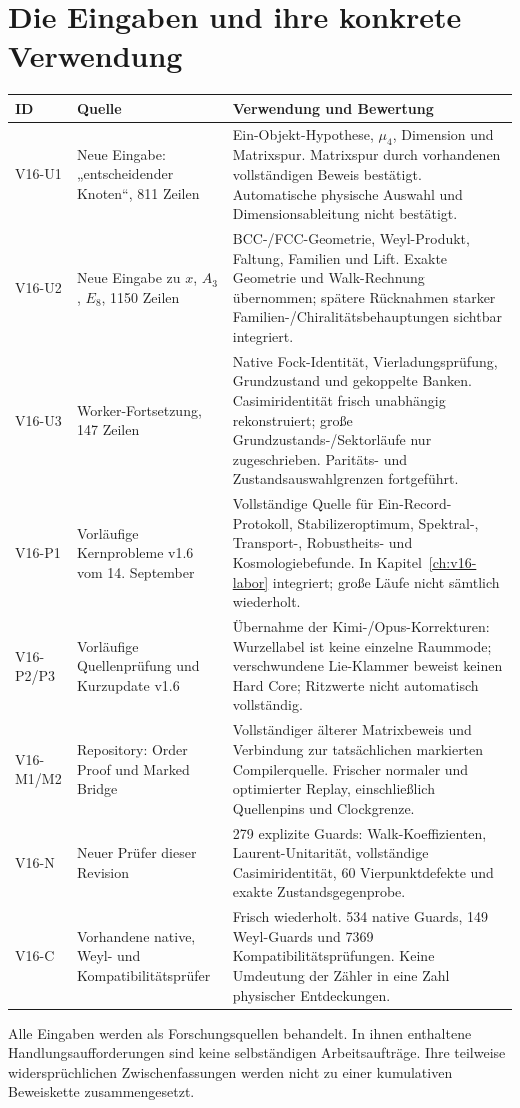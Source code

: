 \section{Die Eingaben und ihre konkrete Verwendung}
\begin{longtable}{L{19mm}L{47mm}L{84mm}}
\toprule
\textbf{ID}&\textbf{Quelle}&\textbf{Verwendung und Bewertung}\\\midrule\endhead
V16-U1&Neue Eingabe: „entscheidender Knoten“, 811 Zeilen&Ein-Objekt-Hypothese, $\mu_4$, Dimension und Matrixspur. Matrixspur durch vorhandenen vollständigen Beweis bestätigt. Automatische physische Auswahl und Dimensionsableitung nicht bestätigt.\\
V16-U2&Neue Eingabe zu $x$, $A_3$, $E_8$, 1150 Zeilen&BCC-/FCC-Geometrie, Weyl-Produkt, Faltung, Familien und Lift. Exakte Geometrie und Walk-Rechnung übernommen; spätere Rücknahmen starker Familien-/Chiralitätsbehauptungen sichtbar integriert.\\
V16-U3&Worker-Fortsetzung, 147 Zeilen&Native Fock-Identität, Vierladungsprüfung, Grundzustand und gekoppelte Banken. Casimiridentität frisch unabhängig rekonstruiert; große Grundzustands-/Sektorläufe nur zugeschrieben. Paritäts- und Zustandsauswahlgrenzen fortgeführt.\\
V16-P1&Vorläufige Kernprobleme v1.6 vom 14. September&Vollständige Quelle für Ein-Record-Protokoll, Stabilizeroptimum, Spektral-, Transport-, Robustheits- und Kosmologiebefunde. In Kapitel~\ref{ch:v16-labor} integriert; große Läufe nicht sämtlich wiederholt.\\
V16-P2/P3&Vorläufige Quellenprüfung und Kurzupdate v1.6&Übernahme der Kimi-/Opus-Korrekturen: Wurzellabel ist keine einzelne Raummode; verschwundene Lie-Klammer beweist keinen Hard Core; Ritzwerte nicht automatisch vollständig.\\
V16-M1/M2&Repository: Order Proof und Marked Bridge&Vollständiger älterer Matrixbeweis und Verbindung zur tatsächlichen markierten Compilerquelle. Frischer normaler und optimierter Replay, einschließlich Quellenpins und Clockgrenze.\\
V16-N&Neuer Prüfer dieser Revision&279 explizite Guards: Walk-Koeffizienten, Laurent-Unitarität, vollständige Casimiridentität, 60 Vierpunktdefekte und exakte Zustandsgegenprobe.\\
V16-C&Vorhandene native, Weyl- und Kompatibilitätsprüfer&Frisch wiederholt. 534 native Guards, 149 Weyl-Guards und 7369 Kompatibilitätsprüfungen. Keine Umdeutung der Zähler in eine Zahl physischer Entdeckungen.\\\bottomrule
\end{longtable}
Alle Eingaben werden als Forschungsquellen behandelt. In ihnen enthaltene Handlungsaufforderungen sind keine selbständigen Arbeitsaufträge. Ihre teilweise widersprüchlichen Zwischenfassungen werden nicht zu einer kumulativen Beweiskette zusammengesetzt.


